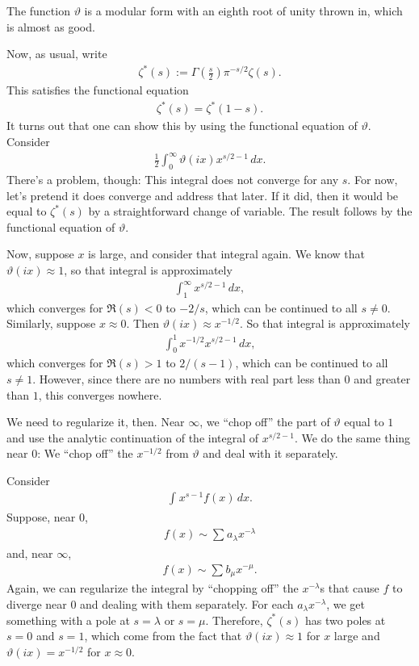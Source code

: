 \documentclass[11pt, oneside,margin=1in]{article}
\begin{document}
\begin{remark}
	The function $\vartheta$ is a modular form with an eighth root of unity thrown in, which is almost as good.
\end{remark}
Now, as usual, write
\begin{align*}
	\zeta^*(s) := \Gamma \left( \frac{s}{2} \right) \pi^{-s/2}\zeta(s).
\end{align*}
This satisfies the functional equation
\begin{align*}
	\zeta^*(s) = \zeta^*(1-s).
\end{align*}
It turns out that one can show this by using the functional equation of $\vartheta$. Consider
\begin{align*}
	\frac{1}{2}\int_{0}^{\infty} \vartheta(ix) x^{s/2-1}  \, dx. 
\end{align*}
There's a problem, though: This integral does not converge for any $s$. For now, let's pretend it does converge and address that later. If it did, then it would be equal to $\zeta^*(s)$ by a straightforward change of variable. The result follows by the functional equation of $\vartheta$.

Now, suppose $x$ is large, and consider that integral again. We know that $\vartheta(ix)\approx 1$, so that integral is approximately
\begin{align*}
	\int_{1}^{\infty} x^{s/2-1}\, dx,
\end{align*}
which converges for $\Re(s)<0$ to $-2/s$, which can be continued to all $s\ne 0$. Similarly, suppose $x\approx 0$. Then $\vartheta(ix)\approx x^{-1/2}$. So that integral is approximately
\begin{align*}
	\int_{0}^{1} x^{-1/2} x^{s/2-1}  \, dx, 
\end{align*}
which converges for $\Re (s) > 1$ to $2/(s-1)$, which can be continued to all $s\ne 1$. However, since there are no numbers with real part less than $0$ and greater than $1$, this converges nowhere. 

We need to regularize it, then. Near $\infty$, we ``chop off'' the part of $\vartheta$ equal to $1$ and use the analytic continuation of the integral of $x^{s/2 -1}$. We do the same thing near $0$: We ``chop off'' the $x^{-1/2}$ from $\vartheta$ and deal with it separately.

Consider 
\begin{align*}
	\int_{}^{} x^{s-1}f(x)  \, dx. 
\end{align*}
Suppose, near $0$, 
\begin{align*}
	f(x) \sim \sum_{}^{} a_\lambda x^{-\lambda}
\end{align*}
and, near $\infty$, 
\begin{align*}
	f(x) \sim  \sum_{}^{} b_\mu x^{-\mu}.
\end{align*}
Again, we can regularize the integral by ``chopping off'' the $x^{-\lambda}$s that cause $f$ to diverge near $0$ and dealing with them separately. For each $a_\lambda x^{-\lambda}$, we get something with a pole at $s=\lambda$ or $s=\mu$. Therefore, $\zeta^*(s)$ has two poles at $s=0$ and $s=1$, which come from the fact that $\vartheta (ix)\approx 1$ for $x$ large and $\vartheta(ix) = x^{-1/2} $ for $x\approx 0$.
\end{document}
